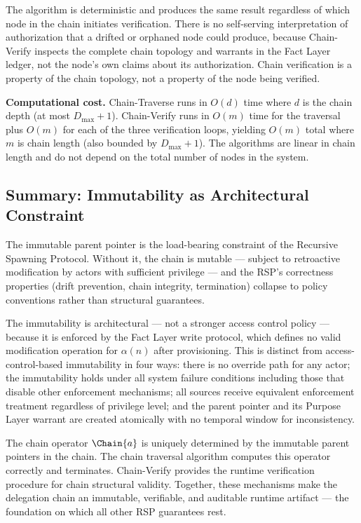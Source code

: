 The algorithm is deterministic and produces the same result regardless of which node in the chain initiates verification. There is no self-serving interpretation of authorization that a drifted or orphaned node could produce, because Chain-Verify inspects the complete chain topology and warrants in the Fact Layer ledger, not the node's own claims about its authorization. Chain verification is a property of the chain topology, not a property of the node being verified.

\medskip
\noindent\textbf{Computational cost.} Chain-Traverse runs in $O(d)$ time where $d$ is the chain depth (at most $D_{\max} + 1$). Chain-Verify runs in $O(m)$ time for the traversal plus $O(m)$ for each of the three verification loops, yielding $O(m)$ total where $m$ is chain length (also bounded by $D_{\max} + 1$). The algorithms are linear in chain length and do not depend on the total number of nodes in the system.

\subsection{Summary: Immutability as Architectural Constraint}
\label{sec:immutability-summary}

The immutable parent pointer is the load-bearing constraint of the Recursive Spawning Protocol. Without it, the chain is mutable --- subject to retroactive modification by actors with sufficient privilege --- and the RSP's correctness properties (drift prevention, chain integrity, termination) collapse to policy conventions rather than structural guarantees.

The immutability is architectural --- not a stronger access control policy --- because it is enforced by the Fact Layer write protocol, which defines no valid modification operation for $\alpha(n)$ after provisioning. This is distinct from access-control-based immutability in four ways: there is no override path for any actor; the immutability holds under all system failure conditions including those that disable other enforcement mechanisms; all sources receive equivalent enforcement treatment regardless of privilege level; and the parent pointer and its Purpose Layer warrant are created atomically with no temporal window for inconsistency.

The chain operator $\Chain{a}$ is uniquely determined by the immutable parent pointers in the chain. The chain traversal algorithm computes this operator correctly and terminates. Chain-Verify provides the runtime verification procedure for chain structural validity. Together, these mechanisms make the delegation chain an immutable, verifiable, and auditable runtime artifact --- the foundation on which all other RSP guarantees rest.
